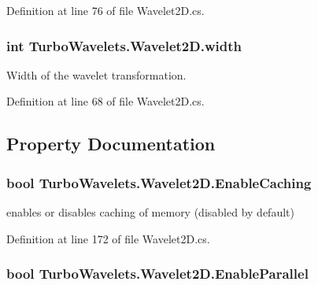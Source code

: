 \-Definition at line 76 of file \-Wavelet2\-D.\-cs.

\hypertarget{class_turbo_wavelets_1_1_wavelet2_d_aaa4b3711957fe1798980e6891331a08d}{
\subsubsection[{width}]{\setlength{\rightskip}{0pt plus 5cm}int {\bf \-Turbo\-Wavelets.\-Wavelet2\-D.\-width}}}\label{class_turbo_wavelets_1_1_wavelet2_d_aaa4b3711957fe1798980e6891331a08d}


\-Width of the wavelet transformation. 



\-Definition at line 68 of file \-Wavelet2\-D.\-cs.



\subsection{\-Property \-Documentation}
\hypertarget{class_turbo_wavelets_1_1_wavelet2_d_abbd41e51d24f8a7912ae47dd364ed4fb}{
\subsubsection[{\-Enable\-Caching}]{\setlength{\rightskip}{0pt plus 5cm}bool {\bf \-Turbo\-Wavelets.\-Wavelet2\-D.\-Enable\-Caching}}}\label{class_turbo_wavelets_1_1_wavelet2_d_abbd41e51d24f8a7912ae47dd364ed4fb}


enables or disables caching of memory (disabled by default) 



\-Definition at line 172 of file \-Wavelet2\-D.\-cs.

\hypertarget{class_turbo_wavelets_1_1_wavelet2_d_abec21e54c6ab8cce0e02ef3ad64ae5af}{
\subsubsection[{\-Enable\-Parallel}]{\setlength{\rightskip}{0pt plus 5cm}bool {\bf \-Turbo\-Wavelets.\-Wavelet2\-D.\-Enable\-Parallel}}}\label{class_turbo_wavelets_1_1_wavelet2_d_abec21e54c6ab8cce0e02ef3ad64ae5af}


